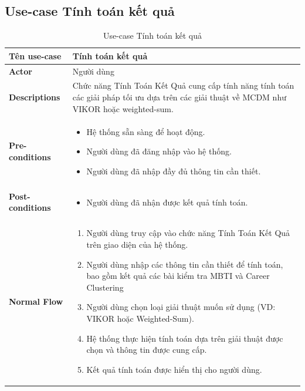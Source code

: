 \subsection{Use-case Tính toán kết quả}
    \begin{longtable}[H]{|l|p{}|}
        \caption{Use-case Tính toán kết quả}
        \\ \hline
        \textbf{Tên use-case} & Tính toán kết quả \\
        \hline
        \textbf{Actor} & Người dùng \\
        \hline
        \textbf{Descriptions} &  Chức năng Tính Toán Kết Quả cung cấp tính năng tính toán các giải pháp tối ưu dựa trên các giải thuật về MCDM như VIKOR hoặc weighted-sum. \\
        \hline
        \textbf{Pre-conditions} & \vspace{-1cm} \begin{itemize}[leftmargin=4mm]
            \setlength\itemsep{0em}
            \item Hệ thống sẵn sàng để hoạt động.
            \item Người dùng đã đăng nhập vào hệ thống.
            \item Người dùng  đã nhập đầy đủ thông tin cần thiết.
        \end{itemize} \\
        
        \hline

        \textbf{Post-conditions} &  \vspace{-1cm} \begin{itemize}[leftmargin=4mm]
            \setlength\itemsep{0em}
            \item Người dùng đã nhận được kết quả tính toán.
        \end{itemize} \\
        
        \hline
        
        \textbf{Normal Flow} &  \vspace{-1cm} 
            \begin{enumerate}[leftmargin=5.5mm]
                \setlength\itemsep{0em}
                \item Người dùng truy cập vào chức năng Tính Toán Kết Quả trên giao diện của hệ thống.
                \item Người dùng nhập các thông tin cần thiết để tính toán, bao gồm kết quả các bài kiểm tra MBTI và Career Clustering
                \item Người dùng chọn loại giải thuật muốn sử dụng (VD: VIKOR hoặc Weighted-Sum). 
                \item Hệ thống thực hiện tính toán dựa trên giải thuật được chọn và thông tin được cung cấp. 
                \item Kết quả tính toán được hiển thị cho người dùng. 
            \end{enumerate}\\
            

\end{longtable}
